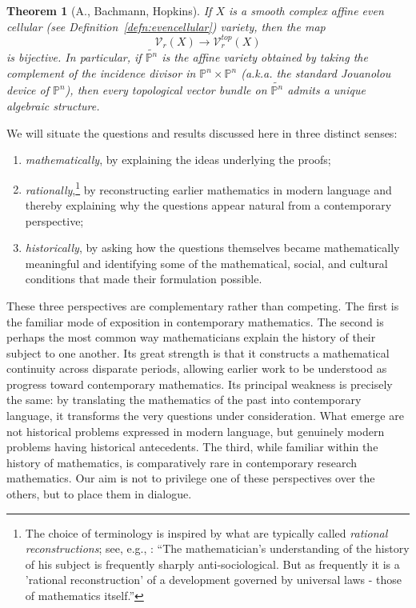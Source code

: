 \documentclass[11pt,leqno]{article}
\renewcommand{\1}{{\rm 1\hspace*{-0.4ex}%
\rule{0.1ex}{1.52ex}\hspace*{0.2ex}}}
\newcommand{\<}[1]{{\langle}#1 {\rangle}}
\newcounter{intro}
\theoremstyle{plain}
\newtheorem{thmintro}{Theorem}
\theoremstyle{definition}
\theoremstyle{remark}
\numberwithin{equation}{subsection}
\begin{document}
\begin{thmintro}[A., Bachmann, Hopkins]
	\label{thmintro:cellularalgebraizability}
If $X$ is a smooth complex affine {\em even cellular} (see \textup{Definition~\ref{defn:evencellular}}) variety, then the map
\[
\mathscr{V}_r(X) \longrightarrow \mathscr{V}_r^{top}(X)
\]	
is bijective.  In particular, if $\widetilde{{\mathbb P}^n}$ is the affine variety obtained by taking the complement of the incidence divisor in ${\mathbb P}^n \times {\mathbb P}^n$ (a.k.a. the standard Jouanolou device of ${\mathbb P}^n$), then every topological vector bundle on $\widetilde{{\mathbb P}^n}$ admits a unique algebraic structure.
\end{thmintro}	

We will situate the questions and results discussed here in three distinct senses:
\begin{enumerate}[noitemsep,topsep=1pt] 	
	\item {\em mathematically}, by explaining the ideas underlying the proofs; 	
	\item {\em rationally},\footnote{The choice of terminology is inspired by what are typically called {\em rational reconstructions}; see, e.g., \cite[pp. 258-9]{Mehrtens}: ``The mathematician's understanding of the history of his subject is frequently sharply anti-sociological. But as frequently it is a 'rational reconstruction' of a development governed by universal laws - those of mathematics itself.''} by reconstructing earlier mathematics in modern language and thereby explaining why the questions appear natural from a contemporary perspective;
	\item {\em historically}, by asking how the questions themselves became mathematically meaningful and identifying some of the mathematical, social, and cultural conditions that made their formulation possible.
	\end{enumerate}
These three perspectives are complementary rather than competing. The first is the familiar mode of exposition in contemporary mathematics. The second is perhaps the most common way mathematicians explain the history of their subject to one another. Its great strength is that it constructs a mathematical continuity across disparate periods, allowing earlier work to be understood as progress toward contemporary mathematics. Its principal weakness is precisely the same: by translating the mathematics of the past into contemporary language, it transforms the very questions under consideration. What emerge are not historical problems expressed in modern language, but genuinely modern problems having historical antecedents. The third, while familiar within the history of mathematics, is comparatively rare in contemporary research mathematics. Our aim is not to privilege one of these perspectives over the others, but to place them in dialogue.  
\end{document}
